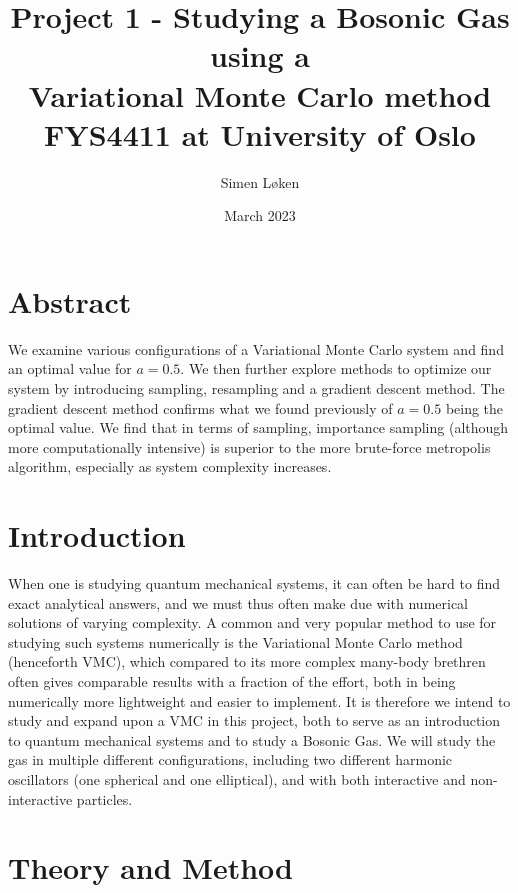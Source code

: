 \documentclass{article}
\title{%
Project 1 - Studying a Bosonic Gas using a \\ Variational Monte Carlo method\\
\large FYS4411 at University of Oslo}
\author{Simen Løken}
\date{March 2023}
\begin{document}
\nocite{*}
\maketitle
{
  \hypersetup{linkcolor=black}
  \tableofcontents
}
\newpage
\section{Abstract}
We examine various configurations of a Variational Monte Carlo system and find an optimal value for $a=0.5$. We then further explore methods to optimize our system by introducing sampling, resampling and a gradient descent method. The gradient descent method confirms what we found previously of $a=0.5$ being the optimal value. We find that in terms of sampling, importance sampling (although more computationally intensive) is superior to the more brute-force metropolis algorithm, especially as system complexity increases. 
\section{Introduction}
When one is studying quantum mechanical systems, it can often be hard to find exact analytical answers, and we must thus often make due with numerical solutions of varying complexity. A common and very popular method to use for studying such systems numerically is the Variational Monte Carlo method (henceforth VMC), which compared to its more complex many-body brethren often gives comparable results with a fraction of the effort, both in being numerically more lightweight and easier to implement.
\newline
It is therefore we intend to study and expand upon a VMC in this project, both to serve as an introduction to quantum mechanical systems and to study a Bosonic Gas. We will study the gas in multiple different configurations, including two different harmonic oscillators (one spherical and one elliptical), and with both interactive and non-interactive particles.
\section{Theory and Method}
\end{document}
